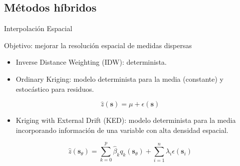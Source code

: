 \documentclass[xcolor={usenames,svgnames,dvipsnames}]{beamer}
\begin{document}
\subsection{Métodos híbridos}
\label{sec:orgcfbd7e7}

\begin{frame}[label={sec:org5a9a1d4}]{Interpolación Espacial}
\begin{block}{\alert{Objetivo}: mejorar la resolución espacial de medidas dispersas}
\begin{itemize}
\item \alert{Inverse Distance Weighting (IDW)}: determinista.

\item \alert{Ordinary Kriging}: modelo determinista para la media (constante) y estocástico para residuos.
\end{itemize}

\[
  \hat{z}(\mathbf{s}) = \mu + \epsilon(\mathbf{s})
\]

\begin{itemize}
\item \alert{Kriging with External Drift (KED)}: modelo determinista para la media incorporando información de una variable con alta densidad espacial.
\end{itemize}
\[  \hat{z}(\mathbf{s}_\theta) =  \sum_{k=0}^p \hat{\beta}_k q_k(\mathbf{s}_\theta) + 
  \sum_{i=1}^n \lambda_i \epsilon(\mathbf{s}_i)
\]

\nocite{Journee.Bertrand2010}
\nocite{Antonanzas-Torres.Canizares.ea2013}
\nocite{Bojanowski.Vrieling.ea2013}
\end{block}
\end{frame}
\end{document}
